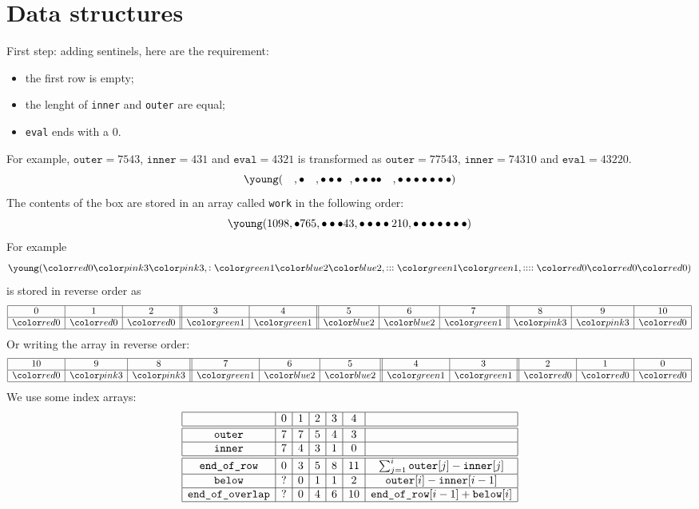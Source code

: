 \documentclass{article}
\begin{document}
\section{Data structures}
\newcommand{\inn}{\texttt{inner}}
\newcommand{\out}{\texttt{outer}}
\newcommand{\evl}{\texttt{eval}}
\newcommand{\innev}{\texttt{innev}}
\newcommand{\work}{\texttt{work}}
\newcommand{\eor}{\texttt{end\_of\_row}}
\newcommand{\eoo}{\texttt{end\_of\_overlap}}
\newcommand{\below}{\texttt{below}}
First step: adding sentinels, here are the requirement:
\begin{itemize}
\item the first row is empty;
\item the lenght of \texttt{inner} and \texttt{outer} are equal;
\item \texttt{eval} ends with a $0$.
\end{itemize}
For example, $\out = 7543$, $\inn=431$ and
$\evl=4321$ is transformed as $\out=77543$,
$\inn=74310$ and $\evl=43220$.
\[
\young(\ \ \ ,\bullet\ \ \ ,\bullet\bullet\bullet\ \ ,\bullet\bullet\bullet\bullet\ \ \ ,\bullet\bullet\bullet\bullet\bullet\bullet\bullet)
\]
The contents of the box are stored in an array called \work{} in the following order:
\def\Dix{10}
\[
\young(\Dix98,\bullet765,\bullet\bullet\bullet43,\bullet\bullet\bullet\bullet210,\bullet\bullet\bullet\bullet\bullet\bullet\bullet)
\]
For example
\[  \young(\AA\AD\AD,:\AB\AC\AC,:::\AB\AB,::::\AA\AA\AA) \]
is stored in reverse order as
\[
\begin{array}{|c|c|c||c|c||c|c|c||c|c|c|}
  \hline
  0   & 1   & 2   & 3   & 4   & 5   & 6   & 7   & 8   & 9   & 10  \\
  \hline
  \AA & \AA & \AA & \AB & \AB & \AC & \AC & \AB & \AD & \AD & \AA \\
  \hline
\end{array}
\]
Or writing the array in reverse order:
\[
\begin{array}{|c|c|c||c|c|c||c|c||c|c|c|}
  \hline
  10  & 9   & 8   & 7   & 6   & 5   & 4   & 3   & 2   & 1   & 0 \\
  \hline
  \AA & \AD & \AD & \AB & \AC & \AC & \AB & \AB & \AA & \AA & \AA \\
  \hline
\end{array}
\]
We use some index arrays:
\[
  \begin{array}{|c|c|c|c|c|c|c|}
    \hline
    & 0 & 1 & 2 & 3 & 4 & \\
    \hline
    \hline
    \out & 7 & 7 & 5 & 4 & 3 & \\
    \hline
    \inn & 7 & 4 & 3 & 1 & 0 & \\
    \hline
    \hline
    \eor & 0 & 3 & 5 & 8 & 11 & \sum_{j=1}^i  \out[j] - \inn[j]\\
    \hline
    \below & ? & 0 & 1 & 1 & 2 & \out[i] - \inn[i-1]\\
    \hline
    \eoo & ? & 0 & 4 & 6 & 10 & \eor[i-1] + \below[i]\\
    \hline
  \end{array}
\]
\end{document}
